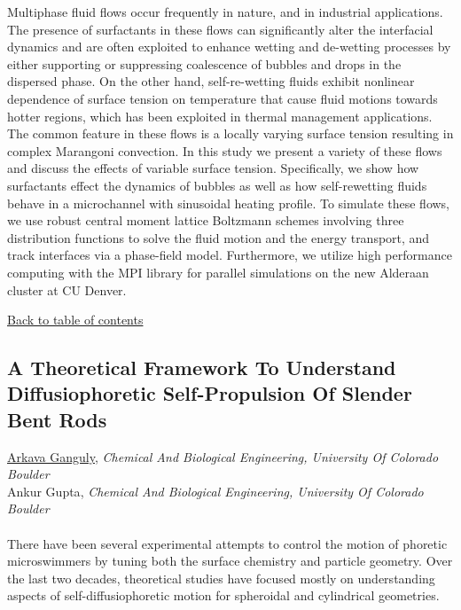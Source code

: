 \noindent Multiphase fluid flows occur frequently in nature, and in industrial applications. The presence of surfactants in these flows can significantly alter the interfacial dynamics and are often exploited to enhance wetting and de-wetting processes by either supporting or suppressing coalescence of bubbles and drops in the dispersed phase. On the other hand, self-re-wetting fluids exhibit nonlinear dependence of surface tension on temperature that cause fluid motions towards hotter regions, which has been exploited in thermal management applications. The common feature in these flows is a locally varying surface tension resulting in complex Marangoni convection. In this study we present a variety of these flows and discuss the effects of variable surface tension. Specifically, we show how surfactants effect the dynamics of bubbles as well as how self-rewetting fluids behave in a microchannel with sinusoidal heating profile. To simulate these flows, we use  robust central moment lattice Boltzmann schemes involving three distribution functions to solve the fluid motion and the energy transport, and track interfaces via a phase-field model. Furthermore, we utilize high performance computing with the MPI library for parallel simulations on the new Alderaan cluster at CU Denver. \\ 
\begin{flushright}\vspace{-0.2 in}\hyperlink{toc}{Back to table of contents}\end{flushright}\vspace{-0.2 in}
\hypertarget{ArkavaGanguly}{\subsection*{\color{CUGOLD} A Theoretical Framework To Understand Diffusiophoretic Self-Propulsion Of Slender Bent Rods}} \vsp 
\underline{Arkava Ganguly}, \textit{Chemical And Biological Engineering, University Of Colorado Boulder}\\ 
{Ankur Gupta}, \textit{Chemical And Biological Engineering, University Of Colorado Boulder}\\ 
\vspace{-0.1 in} \\ 
\noindent There have been several experimental attempts to control the motion of phoretic microswimmers by tuning both the surface chemistry and particle geometry. Over the last two decades, theoretical studies have focused mostly on understanding aspects of self-diffusiophoretic motion for spheroidal and cylindrical geometries. \\ 
